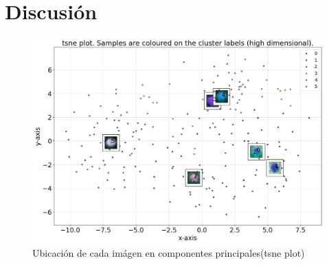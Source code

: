 \documentclass{article}
\begin{document}
\section{Discusión}

\begin{figure}
  \centering
  \includegraphics[width= 0.8\linewidth]{tsne}
  \caption{Ubicación de cada imágen en componentes principales(tsne plot)}
\end{figure}


\printbibliography[title= Referencias, heading=bibintoc]
\end{document}

